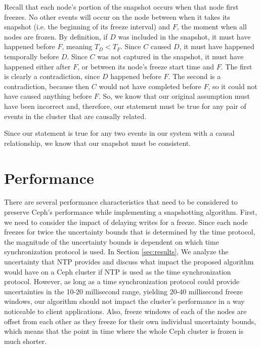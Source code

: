 Recall that each node's portion of the snapshot occurs when that node
first freezes. No other events will occur on the node between when it
takes its snapshot (i.e. the beginning of its freeze interval) and
$F$, the moment when all nodes are frozen. By definition, if $D$ was
included in the snapshot, it must have happened before $F$, meaning
$T_D <T_F$. Since $C$ caused $D$, it must have happened temporally
before $D$.  Since $C$ was not captured in the snapshot, it must have
happened either after $F$, or between its node's freeze start time and
$F$. The first is clearly a contradiction, since $D$ happened before
$F$. The second is a contradiction, because then $C$ would not have
completed before $F$, so it could not have caused anything before
$F$. So, we know that our original assumption must have been incorrect
and, therefore, our statement must be true for any pair of events in
the cluster that are causally related.

Since our statement is true for any two events in our system with a
causal relationship, we know that our snapshot must be consistent.

\section{Performance}

There are several performance characteristics that need to be
considered to preserve Ceph's performance while implementing a
snapshotting algorithm. First, we need to consider the impact of
delaying writes for a freeze. Since each node freezes for twice the
uncertainty bounds that is determined by the time protocol, the magnitude of
the uncertainty bounds is dependent on which time synchronization protocol is
used. In Section \ref{sec:results}, We analyze the uncertainty that NTP
provides and discuss what impact the proposed algorithm would have on a Ceph
cluster if NTP is used as the time synchronization protocol. However,
as long as a time synchronization protocol could provide uncertainties
in the 10-20 millisecond range, yielding 20-40 millisecond freeze %
windows, our algorithm should not impact the cluster's performance in
a way noticeable to client applications. 
Also, freeze windows of each of the nodes are offset
from each other as they freeze for their own individual uncertainty bounds, 
which means that the point in time where the whole Ceph cluster is frozen
is much shorter.

